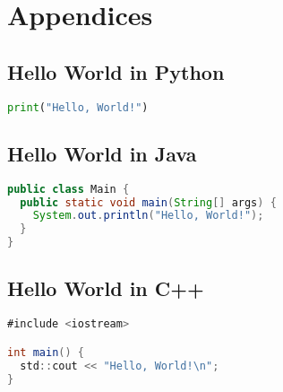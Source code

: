 \section{Appendices}


\subsection{Hello World in Python}

\begin{lstlisting}[language=Python]
print("Hello, World!")
\end{lstlisting}

\subsection{Hello World in Java}

\begin{lstlisting}[language=Java]
public class Main {
  public static void main(String[] args) {
    System.out.println("Hello, World!");
  }
}
\end{lstlisting}

\subsection{Hello World in C++}

\begin{lstlisting}[language=Java]
#include <iostream>

int main() {
  std::cout << "Hello, World!\n";
}
\end{lstlisting}
